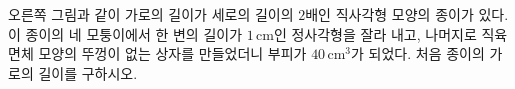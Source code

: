 \noindent\begin{minipage}[t]{0.58\linewidth}\vspace{0pt}\raggedright 오른쪽 그림과 같이 가로의 길이가 세로의 길이의 $2$배인 직사각형 모양의 종이가 있다. 이 종이의 네 모퉁이에서 한 변의 길이가 $1\,\mathrm{cm}$인 정사각형을 잘라 내고, 나머지로 직육면체 모양의 뚜껑이 없는 상자를 만들었더니 부피가 $40\,\mathrm{cm}^3$가 되었다. 처음 종이의 가로의 길이를 구하시오.\end{minipage}\hfill\begin{minipage}[t]{0.4\linewidth}\vspace{0pt}\centering \resizebox{\ifdim\width>\linewidth\linewidth\else\width\fi}{!}{}\end{minipage}\par
